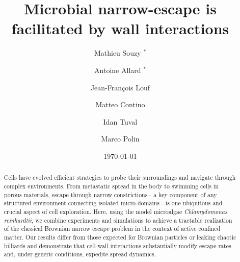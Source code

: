 \documentclass[aps,showpacs,superscriptaddress,amsfonts,twocolumn,prl]{revtex4}
\begin{document}
\title{Microbial narrow-escape is facilitated by wall interactions}

\author{Mathieu Souzy $^*$}
\author{Antoine Allard $^*$}
\author{Jean-Fran\c{c}ois Louf}
\author{Matteo Contino}
\noaffiliation
\author{Idan Tuval}
\author{Marco Polin}


\date{\today}

\begin{abstract}

Cells have evolved efficient strategies to probe their surroundings and navigate through complex environments. From metastatic spread in the body to swimming cells in porous materials, escape through narrow constrictions - a key component of any structured environment connecting isolated micro-domains - is one ubiquitous and crucial aspect of cell exploration. Here, using the model microalgae \textit{Chlamydomonas reinhardtii}, we combine experiments and simulations to achieve a tractable realization of the classical Brownian narrow escape problem in the context of active confined matter. Our results differ from those expected for Brownian particles or leaking chaotic billiards and demonstrate that cell-wall interactions substantially modify escape rates and, under generic conditions, expedite spread dynamics.

\end{abstract}

\maketitle
\def\thefootnote{*}\def\thefootnote{\arabic{footnote}}
\end{document}
